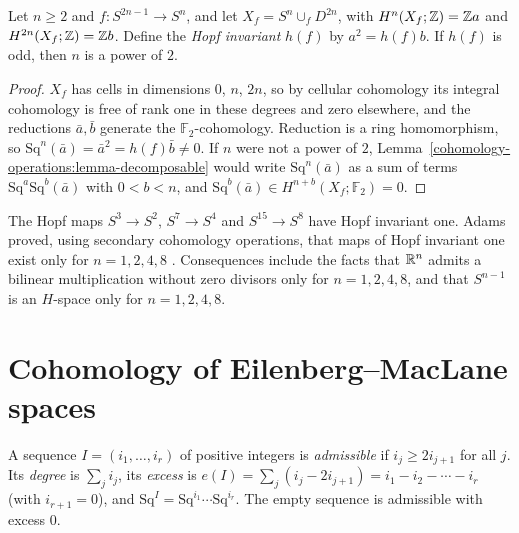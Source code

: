 \begin{corollary}\label{cohomology-operations:corollary-hopf-invariant}
Let $n \geq 2$ and $f \colon S^{2n-1} \to S^n$, and let $X_f = S^n \cup_f D^{2n}$, with $H^n(X_f; \mathbb{Z}) = \mathbb{Z} a$ and $H^{2n}(X_f; \mathbb{Z}) = \mathbb{Z} b$. Define the \emph{Hopf invariant} $h(f)$ by
$a^2 = h(f)b$. If $h(f)$ is odd, then $n$ is a power of $2$.
\end{corollary}

\begin{proof}
$X_f$ has cells in dimensions $0$, $n$, $2n$, so by cellular cohomology its integral cohomology is free of rank one in these degrees and zero elsewhere, and the reductions
$\bar{a}, \bar{b}$ generate the $\mathbb{F}_2$-cohomology. Reduction is a ring homomorphism, so $\mathrm{Sq}^n(\bar a) = \bar a^2 = h(f)\bar b \neq 0$. If $n$ were not a power of $2$,
Lemma~\ref{cohomology-operations:lemma-decomposable} would write $\mathrm{Sq}^n(\bar a)$ as a sum of terms $\mathrm{Sq}^a\mathrm{Sq}^b(\bar a)$ with $0 < b < n$, and
$\mathrm{Sq}^b(\bar a) \in H^{n+b}(X_f; \mathbb{F}_2) = 0$.
\end{proof}

\begin{remark}\label{cohomology-operations:remark-adams}
The Hopf maps $S^3 \to S^2$, $S^7 \to S^4$ and $S^{15} \to S^8$ have Hopf invariant one. Adams proved, using secondary cohomology operations, that maps of Hopf invariant
one exist only for $n = 1, 2, 4, 8$ \cite{adams-1960}. Consequences include the facts that $\mathbb{R}^n$ admits a bilinear
multiplication without zero divisors only for $n = 1, 2, 4, 8$, and that $S^{n-1}$ is an $H$-space only for $n = 1, 2, 4, 8$.
\end{remark}

\section{Cohomology of Eilenberg--MacLane spaces}\label{cohomology-operations:section-cohomology-km}

\begin{definition}\label{cohomology-operations:definition-admissible}
A sequence $I = (i_1, \ldots, i_r)$ of positive integers is \emph{admissible} if $i_j \geq 2i_{j+1}$ for all $j$. Its \emph{degree} is $\sum_j i_j$, its \emph{excess} is
$e(I) = \sum_j(i_j - 2i_{j+1}) = i_1 - i_2 - \cdots - i_r$ (with $i_{r+1} = 0$), and $\mathrm{Sq}^I = \mathrm{Sq}^{i_1} \cdots \mathrm{Sq}^{i_r}$. The empty sequence is admissible with
excess $0$.
\end{definition}

